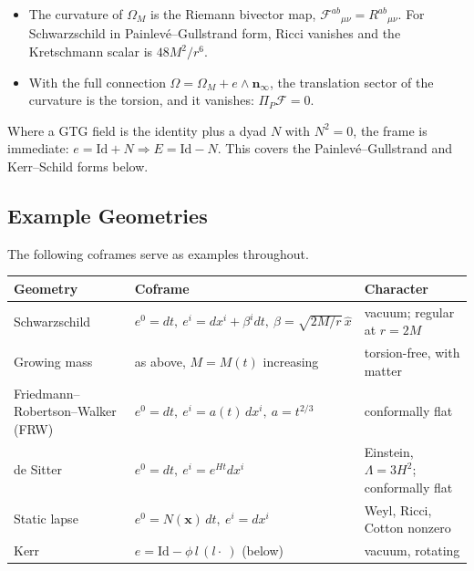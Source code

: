\documentclass[11pt,a4paper]{article}
\newcommand{\F}{\mathcal{F}}
\newcommand{\Om}{\Omega}
\newcommand{\ninf}{\mathbf{n}_\infty}
\newcommand{\wedgeprod}{\mathbin{\wedge}}
\begin{document}
\begin{itemize}
    \item The curvature of \(\Om_M\) is the Riemann bivector map,
    \(\F^{ab}{}_{\mu\nu}=R^{ab}{}_{\mu\nu}\). For Schwarzschild in
    Painlev\'e--Gullstrand form, Ricci vanishes and the Kretschmann
    scalar is \(48M^2/r^6\).

    \item With the full connection
    \(\Om=\Om_M+e\wedgeprod\ninf\), the translation sector of the
    curvature is the torsion, and it vanishes:
    \(\Pi_P\F=0\).
\end{itemize}

Where a GTG field is the identity plus a dyad \(N\) with \(N^2=0\),
the frame is immediate: \(e=\mathrm{Id}+N\Rightarrow E=\mathrm{Id}-N\).
This covers the Painlev\'e--Gullstrand and Kerr--Schild forms below.

\subsection{Example Geometries}

The following coframes serve as examples throughout.

\begin{center}
\renewcommand{\arraystretch}{1.2}
\begin{tabular}{>{\raggedright\arraybackslash}p{}
                >{\raggedright\arraybackslash}p{}
                >{\raggedright\arraybackslash}p{}}
    \toprule
    Geometry & Coframe & Character\\
    \midrule
    Schwarzschild & \(e^0=dt,\ e^i=dx^i+\beta^i dt,\
        \beta=\sqrt{2M/r}\,\hat x\) & vacuum; regular at \(r=2M\)\\
    Growing mass & as above, \(M=M(t)\) increasing & torsion-free,
        with matter\\
    Friedmann--Robertson--Walker (FRW) & \(e^0=dt,\ e^i=a(t)\,dx^i,\
        a=t^{2/3}\) & conformally flat\\
    de Sitter & \(e^0=dt,\ e^i=e^{Ht}dx^i\) & Einstein, \(\Lambda=3H^2\);
        conformally flat\\
    Static lapse & \(e^0=N(\mathbf x)\,dt,\ e^i=dx^i\) & Weyl, Ricci,
        Cotton nonzero\\
    Kerr & \(e=\mathrm{Id}-\phi\,l\,(l\cdot\ )\) (below) & vacuum,
        rotating\\
    \bottomrule
\end{tabular}
\end{center}
\end{document}
